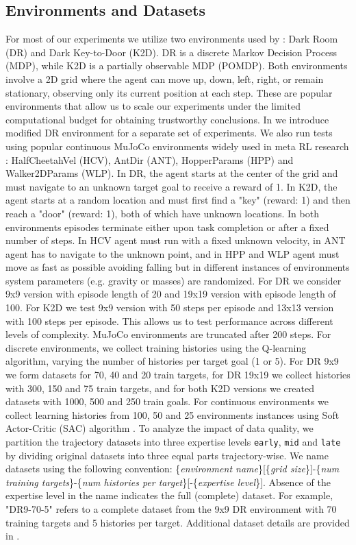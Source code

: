 \documentclass{article}
\begin{document}
\subsection{Environments and Datasets}
For most of our experiments we utilize two environments used by \citet{laskin2022context}: Dark Room (DR) and Dark Key-to-Door (K2D). DR is a discrete Markov Decision Process (MDP), while K2D is a partially observable MDP (POMDP). Both environments involve a 2D grid where the agent can move up, down, left, right, or remain stationary, observing only its current position at each step. These are popular environments that allow us to scale our experiments under the limited computational budget for obtaining trustworthy conclusions. In  we introduce modified DR environment for a separate set of experiments. We also run tests using popular continuous MuJoCo environments widely used in meta RL research \citep{rakelly2019efficient}: HalfCheetahVel (HCV), AntDir (ANT), HopperParams (HPP) and Walker2DParams (WLP).
In DR, the agent starts at the center of the grid and must navigate to an unknown target goal to receive a reward of 1. In K2D, the agent starts at a random location and must first find a "key" (reward: 1) and then reach a "door" (reward: 1), both of which have unknown locations. In both environments episodes terminate either upon task completion or after a fixed number of steps. In HCV agent must run with a fixed unknown velocity, in ANT agent has to navigate to the unknown point, and in HPP and WLP agent must move as fast as possible avoiding falling but in different instances of environments system parameters (e.g. gravity or masses) are randomized.
For DR we consider 9x9 version with episode length of 20 and 19x19 version with episode length of 100.  For K2D we test 9x9 version with 50 steps per episode and 13x13 version with 100 steps per episode. This allows us to test performance across different levels of complexity. MuJoCo environments are truncated after 200 steps.
For discrete environments, we collect training histories using the Q-learning \citep{watkins1992q} algorithm, varying the number of histories per target goal (1 or 5). For DR 9x9 we form datasets for 70, 40 and 20 train targets, for DR 19x19 we collect histories with 300, 150 and 75 train targets, and for both K2D versions we created datasets with 1000, 500 and 250 train goals. For continuous environments we collect learning histories from 100, 50 and 25 environments instances using Soft Actor-Critic (SAC) algorithm \citep{haarnoja2018soft}.
To analyze the impact of data quality, we partition the trajectory datasets into three expertise levels \texttt{early}, \texttt{mid} and \texttt{late} by dividing original datasets into three equal parts trajectory-wise.
We name datasets using the following convention:
\{\textit{environment name}\}[\{\textit{grid size}\}]-\{\textit{num training targets}\}-\{\textit{num histories per target}\}[-\{\textit{expertise level}\}]. Absence of the expertise level in the name indicates the full (complete) dataset. For example, "DR9-70-5" refers to a complete dataset from the 9x9 DR environment with 70 training targets and 5 histories per target. Additional dataset details are provided in .
\end{document}
